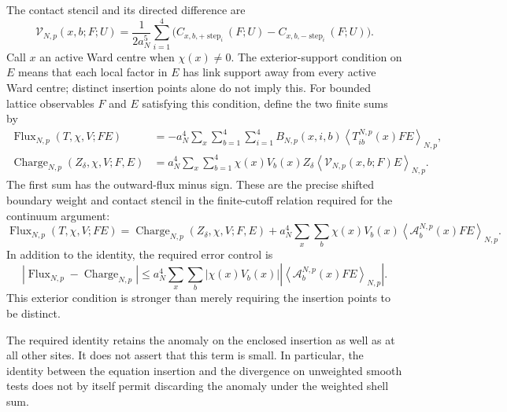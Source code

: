 The contact stencil and its directed difference are
\begin{equation*}
 \mathcal V_{N,p}(x,b;F;U)=\frac{1}{2a_N^5}\sum_{i=1}^4
 \bigl(C_{x,b,+\operatorname{step}_i}(F;U)-C_{x,b,-\operatorname{step}_i}(F;U)\bigr).
\end{equation*}
Call $x$ an active Ward centre when $\chi(x)\ne0$. The exterior-support condition on $E$ means that each local factor in $E$ has link support away from every active Ward centre; distinct insertion points alone do not imply this. For bounded lattice observables $F$ and $E$ satisfying this condition, define the two finite sums by
\begin{align*}
 \operatorname{Flux}_{N,p}(T,\chi,V;F E)
 &=-a_N^4\sum_x\sum_{b=1}^4\sum_{i=1}^4
 B_{N,p}(x,i,b)\left\langle T_{ib}^{N,p}(x)F E\right\rangle_{N,p},\\
 \operatorname{Charge}_{N,p}(Z_\delta,\chi,V;F,E)
 &=a_N^4\sum_x\sum_{b=1}^4\chi(x)V_b(x)Z_\delta
 \left\langle\mathcal V_{N,p}(x,b;F)E\right\rangle_{N,p}.
\end{align*}
The first sum has the outward-flux minus sign. These are the precise shifted boundary weight and contact stencil in the finite-cutoff relation required for the continuum argument:
\begin{equation}\label{eq:ward-finite-flux}
 \operatorname{Flux}_{N,p}(T,\chi,V;F E)
 =\operatorname{Charge}_{N,p}(Z_\delta,\chi,V;F,E)
  +a_N^4\sum_x\sum_b \chi(x)V_b(x)
       \left\langle \mathcal A_b^{N,p}(x)F E\right\rangle_{N,p}.
\end{equation}
In addition to the identity, the required error control is
\begin{equation*}
 \left|\operatorname{Flux}_{N,p}-\operatorname{Charge}_{N,p}\right|
 \le a_N^4\sum_x\sum_b |\chi(x)V_b(x)|
       \left|\left\langle\mathcal A_b^{N,p}(x)F E\right\rangle_{N,p}\right|.
\end{equation*}
This exterior condition is stronger than merely requiring the insertion points to be distinct.

The required identity retains the anomaly on the enclosed insertion as well as at all other sites. It does not assert that this term is small. In particular, the identity between the equation insertion and the divergence on unweighted smooth tests does not by itself permit discarding the anomaly under the weighted shell sum.

